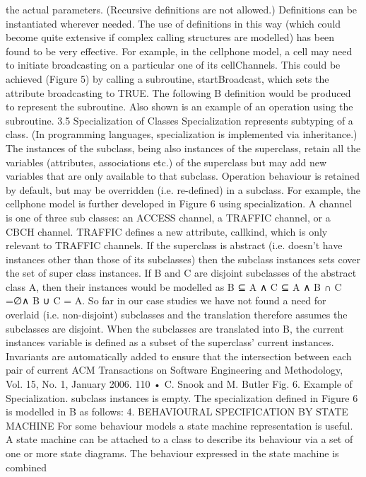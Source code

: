 the actual parameters. (Recursive definitions are not allowed.) Definitions can
be instantiated wherever needed. The use of definitions in this way (which
could become quite extensive if complex calling structures are modelled) has
been found to be very effective. For example, in the cellphone model, a cell may
need to initiate broadcasting on a particular one of its cellChannels. This could
be achieved (Figure 5) by calling a subroutine, startBroadcast, which sets the
attribute broadcasting to TRUE.
The following B definition would be produced to represent the subroutine.
Also shown is an example of an operation using the subroutine.
3.5 Specialization of Classes
Specialization represents subtyping of a class. (In programming languages, specialization is implemented via inheritance.) The instances of the subclass, being
also instances of the superclass, retain all the variables (attributes, associations
etc.) of the superclass but may add new variables that are only available to that
subclass. Operation behaviour is retained by default, but may be overridden
(i.e. re-defined) in a subclass. For example, the cellphone model is further developed in Figure 6 using specialization. A channel is one of three sub classes:
an ACCESS channel, a TRAFFIC channel, or a CBCH channel. TRAFFIC defines a new attribute, callkind, which is only relevant to TRAFFIC channels. If
the superclass is abstract (i.e. doesn’t have instances other than those of its subclasses) then the subclass instances sets cover the set of super class instances.
If B and C are disjoint subclasses of the abstract class A, then their instances
would be modelled as B ⊆ A ∧ C ⊆ A ∧ B ∩ C =∅∧ B ∪ C = A. So far in our
case studies we have not found a need for overlaid (i.e. non-disjoint) subclasses
and the translation therefore assumes the subclasses are disjoint.
When the subclasses are translated into B, the current instances variable
is defined as a subset of the superclass’ current instances. Invariants are automatically added to ensure that the intersection between each pair of current
ACM Transactions on Software Engineering and Methodology, Vol. 15, No. 1, January 2006.
110 • C. Snook and M. Butler
Fig. 6. Example of Specialization.
subclass instances is empty. The specialization defined in Figure 6 is modelled
in B as follows:
4. BEHAVIOURAL SPECIFICATION BY STATE MACHINE
For some behaviour models a state machine representation is useful. A state
machine can be attached to a class to describe its behaviour via a set of one or
more state diagrams. The behaviour expressed in the state machine is combined
